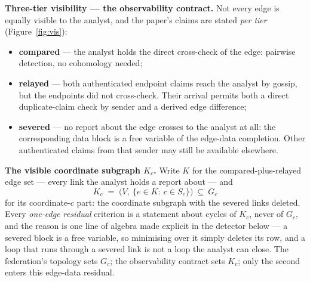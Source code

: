 \documentclass[11pt,a4paper]{article}
\begin{document}
\textbf{Three-tier visibility --- the observability contract.} Not every edge is equally visible to the analyst, and the
paper's claims are stated \emph{per tier} (Figure~\ref{fig:vis}):
\begin{itemize}
\item \textbf{compared} --- the analyst holds the direct cross-check of the edge: pairwise detection, no cohomology needed;
\item \textbf{relayed} --- both authenticated endpoint claims reach the analyst by gossip, but the endpoints did not
cross-check. Their arrival permits both a direct duplicate-claim check by sender and a derived edge difference;
\item \textbf{severed} --- no report about the edge crosses to the analyst at all: the corresponding data block is a free
variable of the edge-data completion. Other authenticated claims from that sender may still be available elsewhere.
\end{itemize}

\textbf{The visible coordinate subgraph $K_c$.} Write $K$ for the compared-plus-relayed edge set --- every link the analyst
holds a report about --- and
\[
K_c \;=\; \bigl(V,\ \{e\in K:\ c\in S_e\}\bigr)\ \subseteq\ G_c
\]
for its coordinate-$c$ part: the coordinate subgraph with the severed links deleted. Every \emph{one-edge residual} criterion
is a statement about cycles of $K_c$, never of $G_c$, and the reason is one line of algebra made explicit in the detector
below --- a severed block is a free variable, so minimising over it simply deletes its row, and a loop that runs through a
severed link is not a loop the analyst can close. The federation's topology sets $G_c$; the observability contract sets
$K_c$; only the second enters this edge-data residual.
\end{document}
